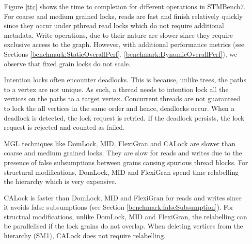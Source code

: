 Figure \ref{ttc} shows the time to completion for different operations in STMBench7. For coarse and medium grained locks, reads are fast and finish relatively quickly since they occur under pthread read locks which do not require additional metadata. Write operations, due to their nature are slower since they require exclusive access to the graph. However, with additional performance metrics (see Sections \ref{benchmark:StaticOverallPerf}, \ref{benchmark:DynamicOverallPerf}), we observe that fixed grain locks do not scale. 

Intention locks often encounter deadlocks. This is because, unlike trees, the paths to a vertex are not unique. 
As such, a thread needs to intention lock all the vertices on the paths to a target vertex. 
Concurrent threads are not guaranteed to lock the all vertices in the same order and hence, deadlocks occur.
When a deadlock is detected, the lock request is retried. If the deadlock persists, the lock request is rejected and counted as failed.


MGL techniques like DomLock, MID, FlexiGran and CALock are slower than coarse and medium grained locks. They are slow for reads and writes due to the presence of false subsumptions between grains causing spurious thread blocks. For structural modifications, DomLock, MID and FlexiGran spend time relabelling the hierarchy which is very expensive. 

CALock is faster than DomLock, MID and FlexiGran for reads and writes since it avoids false subsumptions (see Section \ref{benchmark:falseSubsumption}). For structual modifications, unlike DomLock, MID and FlexiGran, the relabelling can be parallelised if the lock grains do not overlap. When deleting vertices from the hierarchy (SM1), CALock does not require relabelling. 



